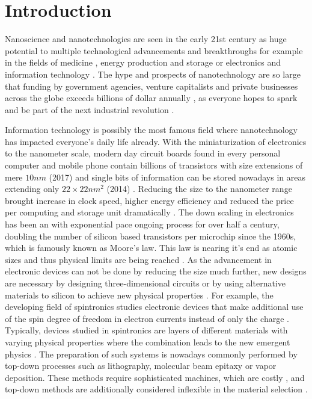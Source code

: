 \documentclass[\main/dresen_thesis.tex]{subfiles}
\begin{document}
\chapter{Introduction}\label{ch:introduction}
  Nanoscience and nanotechnologies are seen in the early 21st century as huge potential to multiple technological advancements and breakthroughs for example in the fields of medicine \cite{Popat_2011_Nanot, Thanh_2012_Magne}, energy production and storage \cite{Huebler_2009_Digit, Shinn_2012_Nucle} or electronics and information technology \cite{Waser_2012_Nanoe, Duart_2006_Nanot}.
  The hype and prospects of nanotechnology are so large that funding by government agencies, venture capitalists and private businesses across the globe exceeds billions of dollar annually \cite{McCray_2005_Wills}, as everyone hopes to spark and be part of the next industrial revolution \cite{Guston_2010_Encyc}.

  Information technology is possibly the most famous field where nanotechnology has impacted everyone's daily life already.
  With the miniaturization of electronics to the nanometer scale, modern day circuit boards found in every personal computer and mobile phone contain billions of transistors with size extensions of mere $10 \unit{nm}$ (2017) \cite{Courtland_2017_Moores} and single bits of information can be stored nowadays in areas extending only $22 \times 22 \unit{nm^2}$ (2014) \cite{Fontana_2015_Volum}.
  Reducing the size to the nanometer range brought increase in clock speed, higher energy efficiency and reduced the price per computing  and storage unit dramatically \cite{Courtland_2017_Moores}.
  The down scaling in electronics has been an with exponential pace ongoing process for over half a century, doubling the number of silicon based transistors per microchip since the 1960s, which is famously known as Moore's law.
  This law is nearing it's end as atomic sizes and thus physical limits are being reached \cite{Waldrop_2016_Moret}.
  As the advancement in electronic devices can not be done by reducing the size much further, new designs are necessary \ie by designing three-dimensional circuits or by using alternative materials to silicon to achieve new physical properties \cite{Waldrop_2016_Moret}.
  For example, the developing field of spintronics studies electronic devices that make additional use of the spin degree of freedom in electron currents instead of only the charge \cite{Wolf_2001_Spint}.
  Typically, devices studied in spintronics are layers of different materials with varying physical properties where the combination leads to the new emergent physics \cite{Zutic_2004_Spint}.
  The preparation of such systems is nowadays commonly performed by top-down processes such as lithography, molecular beam epitaxy or vapor deposition.
  These methods require sophisticated machines, which are costly \cite{Waldrop_2016_Moret, Yu_2006_Nanot}, and top-down methods are additionally considered inflexible in the material selection \cite{Yu_2006_Nanot}.
\end{document}
